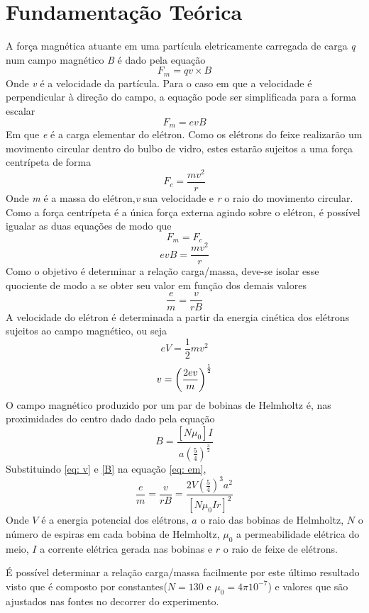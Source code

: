 \section{Fundamentação Teórica}
A força magnética atuante em uma partícula eletricamente carregada de carga {\it q} num campo magnético {\it B} é dado pela equação
\begin{equation}
F_m = qv \times B
\end{equation}
Onde {\it v} é a velocidade da partícula. Para o caso em que a velocidade é perpendicular à direção do campo, a equação pode ser simplificada para a forma escalar
\begin{equation}
	F_m = evB
\end{equation}
Em que {\it e} é a carga elementar do elétron. Como os elétrons do feixe realizarão um movimento circular dentro do bulbo de vidro, estes estarão sujeitos a uma força centrípeta de forma
\begin{equation}
	F_c = \frac{mv^2}{r}
\end{equation}
Onde {\it m} é a massa do elétron,{\it v} sua velocidade e {\it r} o raio do movimento circular. Como a força centrípeta é a única força externa agindo sobre o elétron, é possível igualar as duas equações de modo que
\begin{equation}
	F_m = F_c
\end{equation}
\begin{equation}
	evB = \frac{mv^2}{r}
\end{equation}
Como o objetivo é determinar a relação carga/massa, deve-se isolar esse quociente de modo a se obter seu valor em função dos demais valores
\begin{equation}
	\frac{e}{m}=\frac{v}{rB}
	\label{eq: em}
\end{equation}
A velocidade do elétron é determinada a partir da energia cinética dos elétrons sujeitos ao campo magnético, ou seja
\begin{equation}
	eV = \frac{1}{2}mv^2
\end{equation}
\begin{equation}
	\\ v = \left(\frac{2ev}{m}\right)^{\frac{1}{2}}
	\label{eq: v}
\end{equation}
O campo magnético produzido por um par de bobinas de Helmholtz é, nas proximidades do centro dado dado pela equação
 \begin{equation}
 	B = \frac{[N\mu _0]I}{a\left(\frac{5}{4}\right)^{\frac{3}{2}}}
	\label{B}
 \end{equation}
Substituindo \ref{eq: v} e \ref{B} na equação \ref{eq: em},
\begin{equation}
	\frac{e}{m}=\frac{v}{rB}=\frac{2V\left(\frac{5}{4}\right)^3a^2}{[N\mu _0 Ir]^2}
\end{equation}
Onde $V$ é a energia potencial dos elétrons, $a$ o raio das bobinas de Helmholtz, $N$ o número de espiras em cada bobina de Helmholtz, $\mu _0$ a permeabilidade elétrica do meio, $I$ a corrente elétrica gerada nas bobinas e $r$ o raio de feixe de elétrons.

É possível determinar a relação carga/massa facilmente por este último resultado visto que é composto por constantes($N=130$ e $\mu _0 =4\pi 10^{-7}$) e valores que são ajustados nas fontes no decorrer do experimento.
